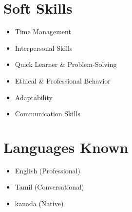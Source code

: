 \documentclass[10pt,a4paper]{article}
\newcommand{\secicon}{}
\begin{document}
\begin{minipage}[t]{0.35\textwidth}
    \vspace{1cm}

    \renewcommand{\secicon}{\faPuzzlePiece}
    \section*{Soft Skills}
    \vspace{-0.15cm}
    \small \textcolor{textgray}{
    \begin{itemize}[leftmargin=*, nosep]
        \item Time Management
        \item Interpersonal Skills
        \item Quick Learner \& Problem-Solving
        \item Ethical \& Professional Behavior
        \item Adaptability
        \item Communication Skills
    \end{itemize}}

    \vspace{0.6cm}

    \renewcommand{\secicon}{\faLanguage}
    \section*{Languages Known}
    \vspace{-0.15cm}
    \small \textcolor{textgray}{
    \begin{itemize}[leftmargin=*, nosep]
        \item English (Professional)
        \item Tamil (Conversational)
        \item kanada (Native)
    \end{itemize}}

\end{minipage}
\hfill
\end{document}
